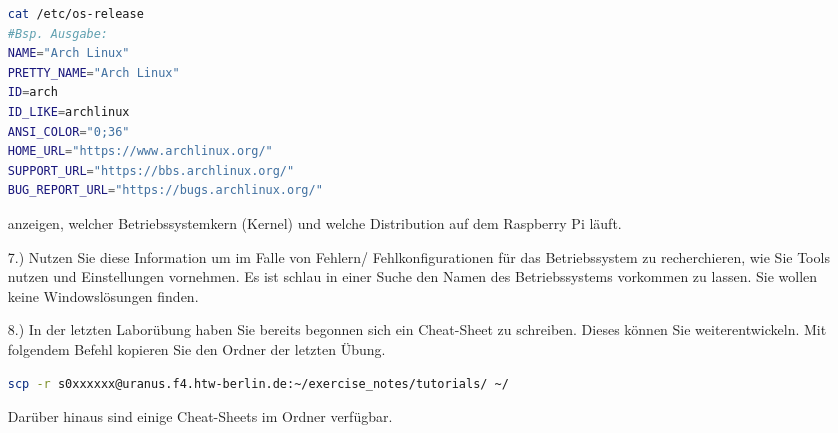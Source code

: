 \documentclass[paper=a4,fontsize=11pt]{scrartcl}%
\numberwithin{equation}{section}
\begin{document}
\begin{itemize}
\begin{lstlisting}[style=Bash, language=Bash]
cat /etc/os-release
#Bsp. Ausgabe:
NAME="Arch Linux"
PRETTY_NAME="Arch Linux"
ID=arch
ID_LIKE=archlinux
ANSI_COLOR="0;36"
HOME_URL="https://www.archlinux.org/"
SUPPORT_URL="https://bbs.archlinux.org/"
BUG_REPORT_URL="https://bugs.archlinux.org/"
\end{lstlisting} anzeigen, welcher Betriebssystemkern (Kernel) und welche Distribution auf dem Raspberry Pi läuft.
	\item[7.)] Nutzen Sie diese Information um im Falle von Fehlern/ Fehlkonfigurationen für das Betriebssystem zu recherchieren, wie Sie Tools nutzen und Einstellungen vornehmen. Es ist schlau in einer Suche den Namen des Betriebssystems vorkommen zu lassen. Sie wollen keine Windowslösungen finden.
	\item[8.)] In der letzten Laborübung haben Sie bereits begonnen sich ein Cheat-Sheet zu schreiben. Dieses können Sie weiterentwickeln. Mit folgendem Befehl kopieren Sie den Ordner der letzten Übung. 
	\begin{lstlisting}[style=Bash, language=Bash]
scp -r s0xxxxxx@uranus.f4.htw-berlin.de:~/exercise_notes/tutorials/ ~/
		\end{lstlisting}
		Darüber hinaus sind einige Cheat-Sheets im Ordner  verfügbar.
\end{itemize}
\vskip0.5in
\end{document}
